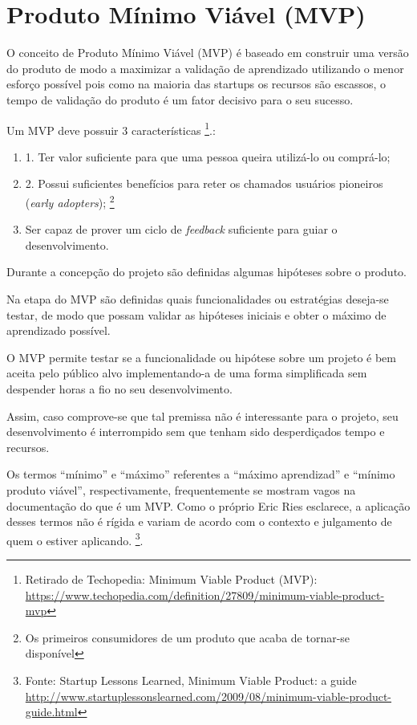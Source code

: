 \section{Produto Mínimo Viável (MVP)}
	\par O conceito de Produto Mínimo Viável (MVP) é baseado em construir uma versão do produto de modo a maximizar a validação de aprendizado utilizando o menor esforço possível \cite{ries:11} pois como na maioria das startups os recursos são escassos, o tempo de validação do produto é um fator decisivo para o seu sucesso.
    \par Um MVP deve possuir 3 características \footnote{ Retirado de Techopedia: Minimum Viable Product (MVP): \url{https://www.techopedia.com/definition/27809/minimum-viable-product-mvp}}.:
    \begin{enumerate}
        \item 1. Ter valor suficiente para que uma pessoa queira utilizá-lo ou comprá-lo;
        \item 2. Possui suficientes benefícios para reter os chamados usuários pioneiros (\emph{early adopters}); \footnote{Os primeiros consumidores de um produto que acaba de tornar-se disponível}
        \item Ser capaz de prover um ciclo de \emph{feedback} suficiente para guiar o desenvolvimento.
\end{enumerate}
    \par Durante a concepção do projeto são definidas algumas hipóteses sobre o produto.
    \par Na etapa do MVP são definidas quais funcionalidades ou estratégias deseja-se testar, de modo que possam validar as hipóteses iniciais e obter o máximo de aprendizado possível.
    \par O MVP permite testar se a funcionalidade ou hipótese sobre um projeto é bem aceita pelo público alvo implementando-a de uma forma simplificada sem despender horas a fio no seu desenvolvimento.
    \par  Assim, caso comprove-se que tal premissa não é interessante para o projeto, seu desenvolvimento é interrompido sem que tenham sido desperdiçados tempo e recursos.
    \par Os termos ``mínimo'' e ``máximo'' referentes a ``máximo aprendizad'' e ``mínimo produto viável'', respectivamente, frequentemente se mostram vagos na documentação do que é um MVP. Como o próprio Eric Ries esclarece, a aplicação desses termos não é rígida e variam de acordo com o contexto e julgamento de quem o estiver aplicando. \footnote{Fonte: Startup Lessons Learned, Minimum Viable Product: a guide \url{http://www.startuplessonslearned.com/2009/08/minimum-viable-product-guide.html}}.
